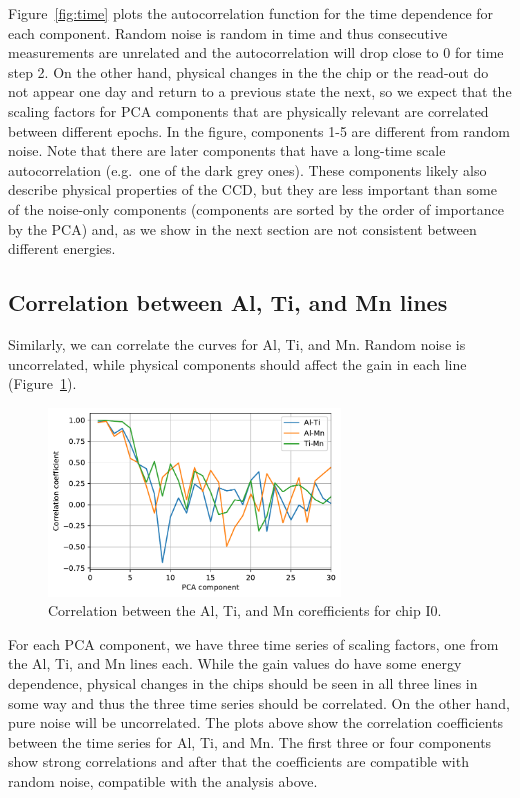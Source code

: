 \documentclass[]{spie}  %
\begin{document}
Figure~\ref{fig:time} plots the autocorrelation function for the time dependence for each component. Random noise is random in time and thus consecutive measurements are unrelated and the autocorrelation will drop close to 0 for time step 2. On the other hand, physical changes in the the chip or the read-out do not appear one day and return to a previous state the next, so we expect that the scaling factors for PCA components that are physically relevant are correlated between different epochs.
In the figure, components 1-5 are different from random noise. Note that there are later components that have a long-time scale autocorrelation (e.g.\ one of the dark grey ones). These components likely also describe physical properties of the CCD, but they are less important than some of the noise-only components (components are sorted by the order of importance by the PCA) and, as we show in the next section are not consistent between different energies.

\subsection{Correlation between Al, Ti, and Mn lines}

Similarly, we can correlate the curves for Al, Ti, and Mn. Random noise is uncorrelated, while physical components should affect the gain in each line (Figure~\ref{fig:encorr}).

\begin{figure} [ht]
  \begin{center}
    \includegraphics[height=5cm]{figures/encorr.pdf}
  \end{center}
  \caption
      {Correlation between the Al, Ti, and Mn corefficients for chip I0.
        \label{fig:encorr}}
\end{figure}

For each PCA component, we have three time series of scaling factors, one from the Al, Ti, and Mn lines each. While the gain values do have some energy dependence, physical changes in the chips should be seen in all three lines in some way and thus the three time series should be correlated. On the other hand, pure noise will be uncorrelated. The plots above show the correlation coefficients between the time series for Al, Ti, and Mn. The first three or four components show strong correlations and after that the coefficients are compatible with random noise, compatible with the analysis above.
\end{document}
